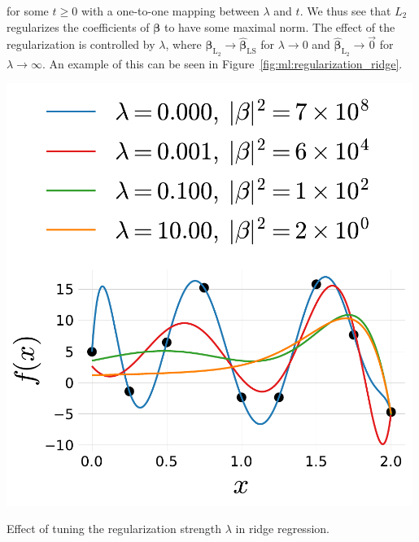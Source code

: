 for some $t \geq 0$ with a one-to-one mapping between $\lambda$ and $t$. We thus see that $L_2$ regularizes the coefficients of $\bm{\beta}$ to have some maximal norm. The effect of the regularization is controlled by $\lambda$, where $\hat{\bm{\beta}}_{\mathrm{L_2}} \rightarrow \hat{\bm{\beta}}_{\mathrm{LS}}$ for $\lambda \rightarrow 0$ and $\hat{\bm{\beta}}_{\mathrm{L_2}} \rightarrow \vec{0}$ for $\lambda \rightarrow \infty$. An example of this can be seen in Figure~\ref{fig:ml:regularization_ridge}. 
\begin{marginfigure}
  \includegraphics[width=0.99\textwidth, trim=5 5 5 5, clip]{figures/ridge_regression/ridge.pdf}
  \caption[Regularization Strength]
    {Effect of tuning the regularization strength $\lambda$ in ridge regression.
    }
  \label{fig:ml:regularization_ridge}
\end{marginfigure}
